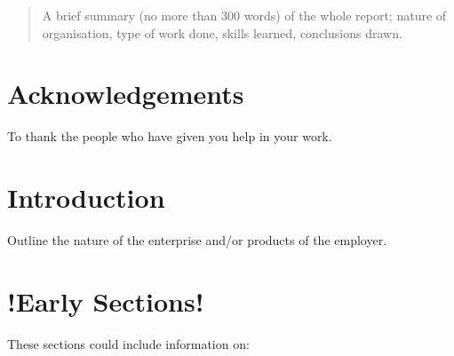 \documentclass[pdftex, 12pt, a4paper, twoside]{article} %
\let\oldsection\section
\def\section{\cleardoublepage\oldsection}
\begin{document}


\thispagestyle{plain} %
\clearpage\mbox{}\clearpage 

\setcounter{page}{3}




\renewcommand{\abstractname}{Summary}
\begin{abstract}
A brief summary (no more than 300 words) of the whole report; nature of organisation, type of work done, skills learned, conclusions drawn.

\lipsum[1-2]
\end{abstract}

\section*{Acknowledgements}
To thank the people who have given you help in your work.

\lipsum[1-2]



\renewcommand{\contentsname}{Table of Contents}
\tableofcontents
\listoffigures
\listoftables\cleardoublepage


\setcounter{page}{1}


\section{Introduction}
\label{sec:introduction}
Outline the nature of the enterprise and/or products of the employer.
\lipsum[1-2]


\section{!Early Sections!}
\label{sec:earlysection}
These sections could include information on:
\end{document}
